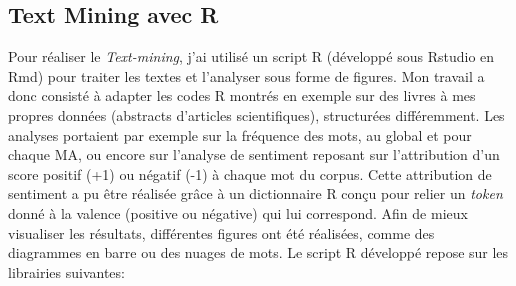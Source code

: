 \documentclass{book}
\begin{document}
\subsection{Text Mining avec R}
\noindent
Pour réaliser le \textit{Text-mining}, j'ai utilisé un script R (développé sous Rstudio
en Rmd) pour traiter les textes et l'analyser sous forme de figures. Mon travail a donc consisté à adapter les
codes R montrés en exemple sur des livres à mes propres données (abstracts
d'articles scientifiques), structurées différemment. Les analyses portaient par
exemple sur la fréquence des mots, au global et pour chaque MA, ou encore sur
l'analyse de sentiment reposant sur l'attribution d'un
score positif (+1) ou négatif (-1) à chaque mot du corpus. Cette attribution de
sentiment a pu être réalisée grâce à un dictionnaire R conçu pour relier un
\textit{token} donné à la valence (positive ou négative) qui lui correspond. Afin de
mieux visualiser les résultats, différentes figures ont été réalisées, comme
des diagrammes en barre ou des nuages de mots. Le script R développé repose sur les librairies suivantes:
\end{document}
